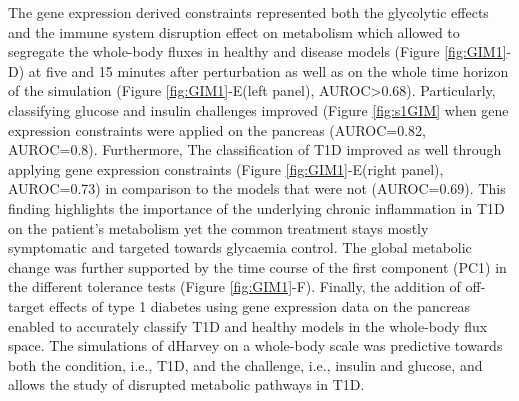The gene expression derived constraints represented both the glycolytic effects and the immune system disruption effect on metabolism which allowed to segregate the whole-body fluxes in healthy and disease models (Figure \ref{fig:GIM1}-D) at five and 15 minutes after perturbation as well as on the whole time horizon of the simulation (Figure \ref{fig:GIM1}-E(left panel), AUROC>0.68). Particularly, classifying glucose and insulin challenges improved (Figure \ref{fig:s1GIM} when gene expression constraints were applied on the pancreas (AUROC=0.82, AUROC=0.8). Furthermore, The classification of T1D improved as well through applying gene expression constraints (Figure \ref{fig:GIM1}-E(right panel), AUROC=0.73) in comparison to the models that were not (AUROC=0.69). This finding highlights the importance of the underlying chronic inflammation in T1D on the patient's metabolism yet the common treatment stays mostly symptomatic and targeted towards glycaemia control. The global metabolic change was further supported by the time course of the first component (PC1) in the different tolerance tests (Figure \ref{fig:GIM1}-F). Finally, the addition of off-target effects of type 1 diabetes using gene expression data on the pancreas enabled to accurately classify T1D and healthy models in the whole-body flux space. The simulations of dHarvey on a whole-body scale was predictive towards both the condition, i.e., T1D, and the challenge, i.e., insulin and glucose, and allows the study of disrupted metabolic pathways in T1D.
